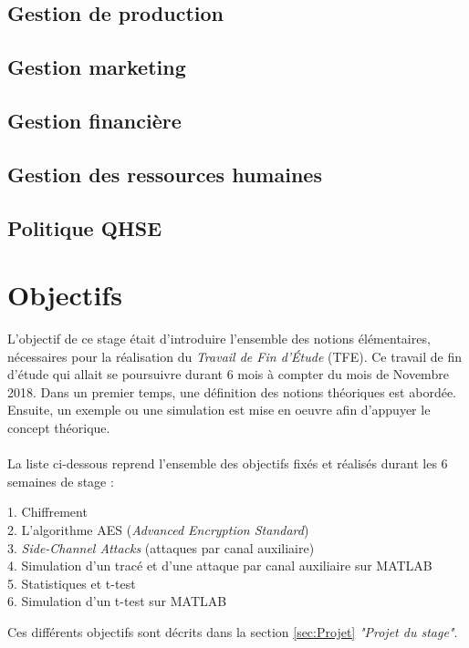 \documentclass[10pt, oneside, a4paper]{article}
\begin{document}
\subsection{Gestion de production}


\subsection{Gestion marketing}


\subsection{Gestion financière}


\subsection{Gestion des ressources humaines}


\subsection{Politique QHSE}


\newpage
\section{Objectifs }
\label{sec:objectifs}

 
L'objectif de ce stage était d'introduire l'ensemble des notions élémentaires, nécessaires pour la réalisation du \textit{Travail de Fin d'Étude} (TFE). Ce travail de fin d'étude qui allait se poursuivre durant 6 mois à compter du mois de Novembre 2018. Dans un premier temps, une définition des notions théoriques est abordée. Ensuite, un exemple ou une simulation est mise en oeuvre afin d'appuyer le concept théorique.\\ \\
La liste ci-dessous reprend l'ensemble des objectifs fixés et réalisés durant les 6 semaines de stage : 
\begin{description}
\item[1. Chiffrement] 
\item[2. L'algorithme AES (\textit{Advanced Encryption Standard})]
\item[3. \textit{Side-Channel Attacks} (attaques par canal auxiliaire)]
\item[4. Simulation d'un tracé et d'une attaque par canal auxiliaire sur MATLAB] 
\item[5. Statistiques et t-test] 
\item[6. Simulation d'un t-test sur MATLAB] 
\end{description}
Ces différents objectifs sont décrits dans la section \ref{sec:Projet} \textit{"Projet du stage"}.
\end{document}
